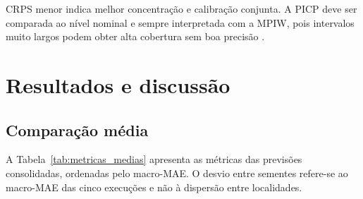 \documentclass[10pt,conference,a4paper]{IEEEtran}
\begin{document}
CRPS menor indica melhor concentração e calibração conjunta. A PICP deve ser
comparada ao nível nominal e sempre interpretada com a MPIW, pois intervalos
muito largos podem obter alta cobertura sem boa precisão \cite{gneiting2007}.

\section{Resultados e discussão}
\label{sec:resultados}

\subsection{Comparação média}

A Tabela~\ref{tab:metricas_medias} apresenta as métricas das previsões
consolidadas, ordenadas pelo macro-MAE. O desvio entre sementes refere-se ao
macro-MAE das cinco execuções e não à dispersão entre localidades.
\end{document}
